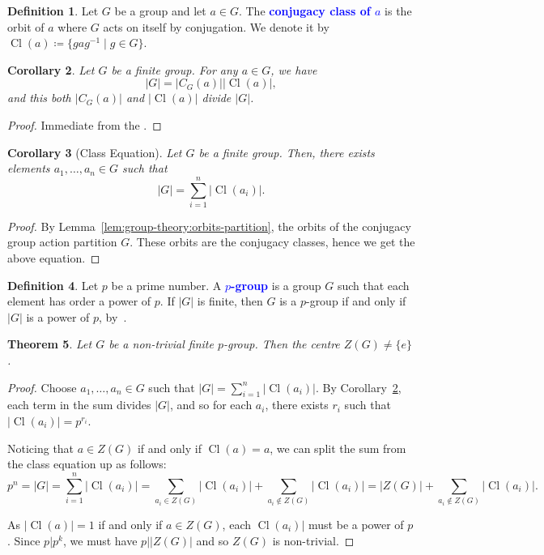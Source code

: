 \documentclass[12pt]{report}
\newcommand{\indx}[1]{\index{#1}\textbf{\textcolor{blue}{#1}}}
\newcommand{\Cl}{\operatorname{Cl}}
\newtheorem{theorem}{Theorem}[section] %
\newtheorem{corollary}[theorem]{Corollary}
\theoremstyle{definition}
\newtheorem{definition}[theorem]{Definition}
\begin{document}
\begin{definition}\label{def:group-theory:conjugacy-class}
  Let \(G\) be a group and let \(a \in G\). The \indx{conjugacy class of \(a\)} is the orbit of \(a\) where \(G\) acts on itself by conjugation. We denote it by \(\Cl(a) \coloneqq \{gag^{-1} \mid g \in G\}\).
\end{definition}

\begin{corollary}\label{cor:group-theory:centralizer-conjugacy-classes-divide-G}
  Let \(G\) be a finite group. For any \(a \in G\), we have
  \[|G| = |C_{G}(a)| |\Cl(a)|,\]
  and this both \(|C_{G}(a)|\) and \(|\Cl(a)|\) divide \(|G|\).
\end{corollary}

\begin{proof}
  Immediate from the .
\end{proof}

\begin{corollary}[Class Equation]\label{cor:group-theory:class-equation}
  Let \(G\) be a finite group. Then, there exists elements \(a_{1}, \ldots, a_{n} \in G\) such that
  \[|G| = \sum_{i=1}^{n} |\Cl(a_{i})|.\]
\end{corollary}

\begin{proof}
  By Lemma~\ref{lem:group-theory:orbits-partition}, the orbits of the conjugacy group action partition \(G\). These orbits are the conjugacy classes, hence we get the above equation.
\end{proof}


\begin{definition}
  Let \(p\) be a prime number. A \indx{\(p\)-group} is a group \(G\) such that each element has order a power of \(p\). If \(|G|\) is finite, then \(G\) is a \(p\)-group if and only if \(|G|\) is a power of \(p\), by~.
\end{definition}


\begin{theorem}\label{thm:group-theory:p-group-non-trivial-centre}
  Let \(G\) be a non-trivial finite \(p\)-group. Then the centre \(Z(G) \neq \{e\}\).
\end{theorem}

\begin{proof}
  Choose \(a_{1}, \ldots, a_{n} \in G\) such that \(|G| = \sum_{i=1}^{n} |\Cl(a_{i})|\). By Corollary~\ref{cor:group-theory:centralizer-conjugacy-classes-divide-G}, each term in the sum divides \(|G|\), and so for each \(a_{i}\), there exists \(r_{i}\) such that \(|\Cl(a_{i})| = p^{r_{i}}\).

  Noticing that \(a \in Z(G)\) if and only if \(\Cl(a) = {a}\), we can split the sum from the class equation up as follows:
  \[ p^{n} = |G| = \sum_{i=1}^{n} |\Cl(a_{i})| = \sum_{a_{i} \in Z(G)} |\Cl(a_{i})|+ \sum_{a_i \not\in Z(G)} |\Cl(a_{i})|= |Z(G)| + \sum_{a_i \not\in Z(G)}|\Cl(a_{i})|.\]

  As \(|\Cl(a)| = 1\) if and only if \(a \in Z(G)\), each \(\Cl(a_{i})|\) must be a power of \(p\). Since \(p | p^{k}\), we must have \(p | |Z(G)|\) and so \(Z(G)\) is non-trivial.
\end{proof}
\end{document}
